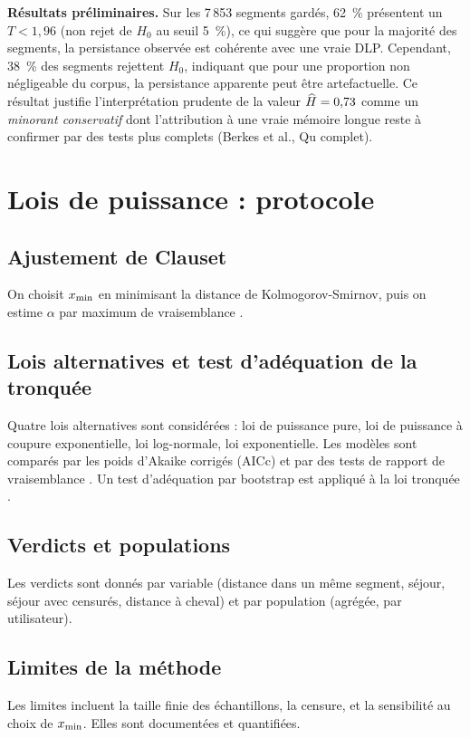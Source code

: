 \medskip
\textbf{Résultats préliminaires.} Sur les 7\,853 segments gardés, 62~\% présentent un $T < 1{,}96$ (non rejet de $H_0$ au seuil 5~\%), ce qui suggère que pour la majorité des segments, la persistance observée est cohérente avec une vraie DLP. Cependant, 38~\% des segments rejettent $H_0$, indiquant que pour une proportion non négligeable du corpus, la persistance apparente peut être artefactuelle. Ce résultat justifie l'interprétation prudente de la valeur $\widehat{H} = 0{,}73$ comme un \emph{minorant conservatif} dont l'attribution à une vraie mémoire longue reste à confirmer par des tests plus complets (Berkes et al., Qu complet).

\section{Lois de puissance : protocole}
\label{sec:lois_puissance}

\subsection{Ajustement de Clauset}
On choisit $x_{\min}$ en minimisant la distance de Kolmogorov-Smirnov, puis on estime $\alpha$ par maximum de vraisemblance \cite{clauset2009}.

\subsection{Lois alternatives et test d'adéquation de la tronquée}
Quatre lois alternatives sont considérées : loi de puissance pure, loi de puissance à coupure exponentielle, loi log-normale, loi exponentielle. Les modèles sont comparés par les poids d'Akaike corrigés (AICc) et par des tests de rapport de vraisemblance \cite{vuong1989}. Un test d'adéquation par bootstrap est appliqué à la loi tronquée \cite{clauset2009}.

\subsection{Verdicts et populations}
Les verdicts sont donnés par variable (distance dans un même segment, séjour, séjour avec censurés, distance à cheval) et par population (agrégée, par utilisateur).

\subsection{Limites de la méthode}
Les limites incluent la taille finie des échantillons, la censure, et la sensibilité au choix de $x_{\min}$. Elles sont documentées et quantifiées.

